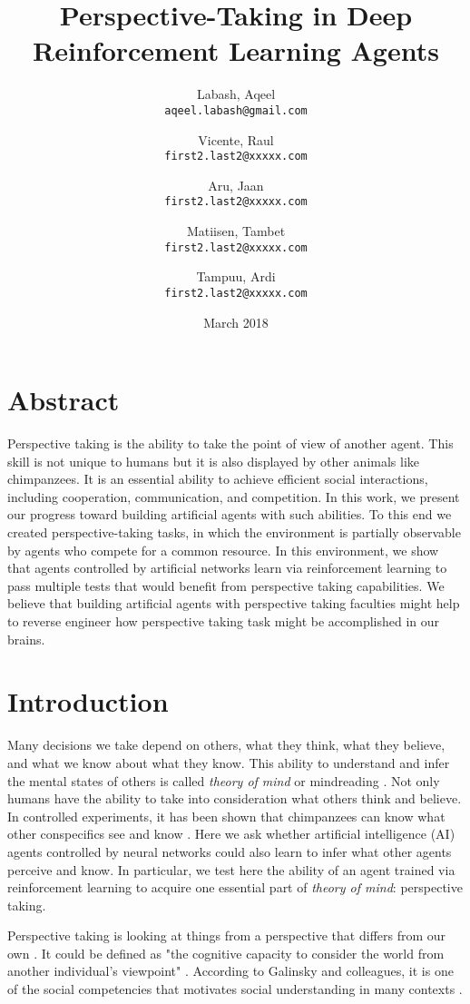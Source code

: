 \documentclass{article}
\title{Perspective-Taking in Deep Reinforcement Learning Agents}
\author{
  Labash, Aqeel\\
  \texttt{aqeel.labash@gmail.com}\\
  \and
  Vicente, Raul\\
  \texttt{first2.last2@xxxxx.com}
  \and
  Aru, Jaan\\
  \texttt{first2.last2@xxxxx.com}
  \and
  Matiisen, Tambet\\
  \texttt{first2.last2@xxxxx.com}
  \and
  Tampuu, Ardi\\
  \texttt{first2.last2@xxxxx.com}
}
\date{March 2018}
\begin{document}
\maketitle
\section*{Abstract}
Perspective taking is the ability to take the point of view of another agent. This skill is not unique to humans but it is also displayed by other animals like chimpanzees. It is an essential ability to achieve efficient social interactions, including cooperation, communication, and competition. In this work, we present our progress toward building artificial agents with such abilities. To this end we created perspective-taking tasks, in which the environment is partially observable by agents who compete for a common resource. In this environment, we show that agents controlled by artificial networks learn via reinforcement learning to pass multiple tests that would benefit from perspective taking capabilities. We believe that building artificial agents with perspective taking faculties might help to reverse engineer how perspective taking task might be accomplished in our brains.


\section{Introduction}
Many decisions we take depend on others, what they think, what they believe, and what we know about what they know. This ability to understand and infer the mental states of others is called \textit{theory of mind} \cite{premack1978does} or mindreading \cite{apperly2011mindreaders}. Not only humans have the ability to take into consideration what others think and believe. In controlled experiments, it has been shown that chimpanzees can know what other conspecifics see and know \cite{hare2000chimpanzees}. Here we ask whether artificial intelligence (AI) agents controlled by neural networks \cite{Goodfellow-et-al-2016} could also learn to infer what other agents perceive and know. In particular, we test here the ability of an agent trained via reinforcement learning to acquire one essential part of \textit{theory of mind}: perspective taking. 

Perspective taking is looking at things from a perspective that differs from our own \cite{ryskin2015perspective}. It could be defined as "the cognitive capacity to consider the world from another individual's viewpoint" \cite{davis1983measuring}. According to Galinsky and colleagues, it is one of the social competencies that motivates social understanding in many contexts \cite{galinsky2008pays}.
\end{document}

